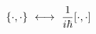 \documentclass[preview]{standalone}
\begin{document}
\begin{align*}
\special{dvisvgm:raw <g id='unique000'>}\pb{\cdot}{\cdot}\ \longleftrightarrow\ \frac{1}{i\hbar}[\cdot,\cdot]\special{dvisvgm:raw </g>}
\end{align*}
\end{document}
